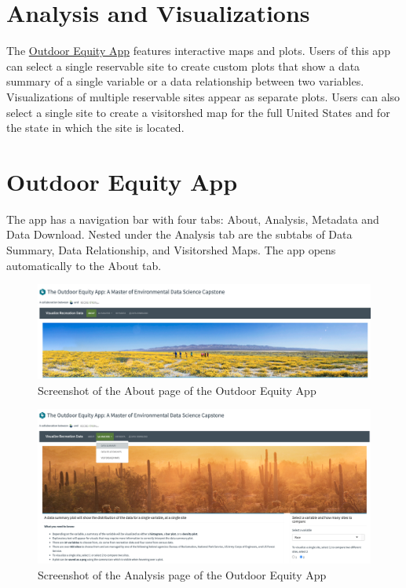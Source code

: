 \documentclass[
]{book}
\begin{document}
\hypertarget{analysis-and-visualizations}{%
\section{Analysis and Visualizations}\label{analysis-and-visualizations}}

The \href{https://shinyapps.bren.ucsb.edu/oe_app/}{Outdoor Equity App} features interactive maps and plots. Users of this app can select a single reservable site to create custom plots that show a data summary of a single variable or a data relationship between two variables. Visualizations of multiple reservable sites appear as separate plots. Users can also select a single site to create a visitorshed map for the full United States and for the state in which the site is located.

\hypertarget{outdoor-equity-app}{%
\section{Outdoor Equity App}\label{outdoor-equity-app}}

The app has a navigation bar with four tabs: About, Analysis, Metadata and Data Download. Nested under the Analysis tab are the subtabs of Data Summary, Data Relationship, and Visitorshed Maps. The app opens automatically to the About tab.

\begin{figure}
\includegraphics[width=22.78in]{images/screenshot_about} \caption{Screenshot of the About page of the Outdoor Equity App}\label{fig:app-screenshot1}
\end{figure}

\begin{figure}
\includegraphics[width=22.83in]{images/screenshot_data-summary} \caption{Screenshot of the Analysis page of the Outdoor Equity App}\label{fig:app-screenshot2}
\end{figure}
\end{document}
